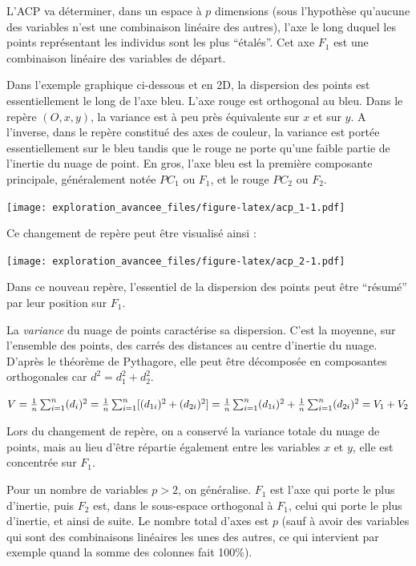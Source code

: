 \documentclass[]{book}
\begin{document}
L'ACP va déterminer, dans un espace à \(p\) dimensions (sous l'hypothèse qu'aucune des variables n'est une combinaison linéaire des autres), l'axe le long duquel les points représentant les individus sont les plus ``étalés''. Cet axe \(F_1\) est une combinaison linéaire des variables de départ.

Dans l'exemple graphique ci-dessous et en 2D, la dispersion des points est essentiellement le long de l'axe bleu. L'axe rouge est orthogonal au bleu. Dans le repère \((O, x, y)\), la variance est à peu près équivalente sur \(x\) et sur \(y\). A l'inverse, dans le repère constitué des axes de couleur, la variance est portée essentiellement sur le bleu tandis que le rouge ne porte qu'une faible partie de l'inertie du nuage de point. En gros, l'axe bleu est la première composante principale, généralement notée \(PC_1\) ou \(F_1\), et le rouge \(PC_2\) ou \(F_2\).

\texttt{[image: exploration\_avancee\_files/figure-latex/acp\_1-1.pdf]}

Ce changement de repère peut être visualisé ainsi :

\texttt{[image: exploration\_avancee\_files/figure-latex/acp\_2-1.pdf]}

Dans ce nouveau repère, l'essentiel de la dispersion des points peut être ``résumé'' par leur position sur \(F_1\).

La \emph{variance} du nuage de points caractérise sa dispersion. C'est la moyenne, sur l'ensemble des points, des carrés des distances au centre d'inertie du nuage. D'après le théorème de Pythagore, elle peut être décomposée en composantes orthogonales car \(d^2=d_1^2+d_2^2\).

\(V={\frac 1n}\sum _{{i=1}}^{n}(d_{i})^{2}\\  ={\frac 1n}\sum _{{i=1}}^{n}[(d_{1i})^{2}+(d_{2i})^{2}]\\  ={\frac 1n}\sum _{{i=1}}^{n}(d_{1i})^{2}+{\frac 1n}\sum _{{i=1}}^{n}(d_{2i})^{2}\\  =V_1+V_2\)

Lors du changement de repère, on a conservé la variance totale du nuage de points, mais au lieu d'être répartie également entre les variables \(x\) et \(y\), elle est concentrée sur \(F_1\).

Pour un nombre de variables \(p>2\), on généralise. \(F_1\) est l'axe qui porte le plus d'inertie, puis \(F_2\) est, dans le sous-espace orthogonal à \(F_1\), celui qui porte le plus d'inertie, et ainsi de suite. Le nombre total d'axes est \(p\) (sauf à avoir des variables qui sont des combinaisons linéaires les unes des autres, ce qui intervient par exemple quand la somme des colonnes fait 100\%).
\end{document}
